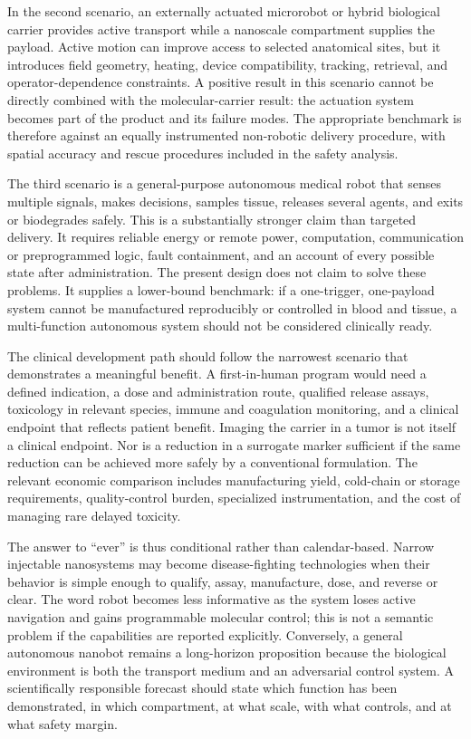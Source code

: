 \documentclass[conference]{IEEEtran}
\begin{document}
In the second scenario, an externally actuated microrobot or hybrid biological carrier provides active transport while a nanoscale compartment supplies the payload. Active motion can improve access to selected anatomical sites, but it introduces field geometry, heating, device compatibility, tracking, retrieval, and operator-dependence constraints. A positive result in this scenario cannot be directly combined with the molecular-carrier result: the actuation system becomes part of the product and its failure modes. The appropriate benchmark is therefore against an equally instrumented non-robotic delivery procedure, with spatial accuracy and rescue procedures included in the safety analysis.

The third scenario is a general-purpose autonomous medical robot that senses multiple signals, makes decisions, samples tissue, releases several agents, and exits or biodegrades safely. This is a substantially stronger claim than targeted delivery. It requires reliable energy or remote power, computation, communication or preprogrammed logic, fault containment, and an account of every possible state after administration. The present design does not claim to solve these problems. It supplies a lower-bound benchmark: if a one-trigger, one-payload system cannot be manufactured reproducibly or controlled in blood and tissue, a multi-function autonomous system should not be considered clinically ready.

The clinical development path should follow the narrowest scenario that demonstrates a meaningful benefit. A first-in-human program would need a defined indication, a dose and administration route, qualified release assays, toxicology in relevant species, immune and coagulation monitoring, and a clinical endpoint that reflects patient benefit. Imaging the carrier in a tumor is not itself a clinical endpoint. Nor is a reduction in a surrogate marker sufficient if the same reduction can be achieved more safely by a conventional formulation. The relevant economic comparison includes manufacturing yield, cold-chain or storage requirements, quality-control burden, specialized instrumentation, and the cost of managing rare delayed toxicity.

The answer to ``ever'' is thus conditional rather than calendar-based. Narrow injectable nanosystems may become disease-fighting technologies when their behavior is simple enough to qualify, assay, manufacture, dose, and reverse or clear. The word robot becomes less informative as the system loses active navigation and gains programmable molecular control; this is not a semantic problem if the capabilities are reported explicitly. Conversely, a general autonomous nanobot remains a long-horizon proposition because the biological environment is both the transport medium and an adversarial control system. A scientifically responsible forecast should state which function has been demonstrated, in which compartment, at what scale, with what controls, and at what safety margin.
\end{document}
